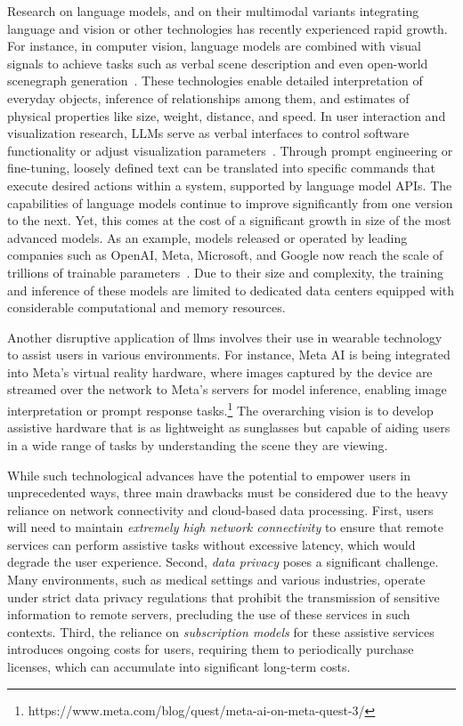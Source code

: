Research on language models, and on their multimodal variants integrating language and vision or other technologies has recently experienced rapid growth.
For instance, in computer vision, language models are combined with visual signals to achieve tasks such as verbal scene description and even open-world scenegraph generation~\cite{Koch2024}. These technologies enable detailed interpretation of everyday objects, inference of relationships among them, and estimates of physical properties like size, weight, distance, and speed.  
In user interaction and visualization research, LLMs serve as verbal interfaces to control software functionality or adjust visualization parameters~\cite{Jia2024_1,Jia2024_2}.
Through prompt engineering or fine-tuning, loosely defined text can be translated into specific commands that execute desired actions within a system, supported by language model APIs.
The capabilities of language models continue to improve significantly from one version to the next. Yet, this comes at the cost of a significant growth in size of the most advanced models. As an example, models released or operated by leading companies such as OpenAI, Meta, Microsoft, and Google now reach the scale of trillions of trainable parameters~\cite{ChatGPT-Hystor_2023}. Due to their size and complexity, the training and inference of these models are limited to dedicated data centers equipped with considerable computational and memory resources. 

Another disruptive application of \glspl{llm} involves their use in wearable technology to assist users in various environments. For instance, Meta AI is being integrated into Meta's virtual reality hardware, where images captured by the device are streamed over the network to Meta's servers for model inference, enabling image interpretation or prompt response tasks.\footnote{https://www.meta.com/blog/quest/meta-ai-on-meta-quest-3/} The overarching vision is to develop assistive hardware that is as lightweight as sunglasses but capable of aiding users in a wide range of tasks by understanding the scene they are viewing.

While such technological advances have the potential to empower users in unprecedented ways, three main drawbacks must be considered due to the heavy reliance on network connectivity and cloud-based data processing. First, users will need to maintain {\em extremely high network connectivity} to ensure that remote services can perform assistive tasks without excessive latency, which would degrade the user experience. Second, {\em data privacy} poses a significant challenge. Many environments, such as medical settings and various industries, operate under strict data privacy regulations that prohibit the transmission of sensitive information to remote servers, precluding the use of these services in such contexts. Third, the reliance on {\em subscription models} for these assistive services introduces ongoing costs for users, requiring them to periodically purchase licenses, which can accumulate into significant long-term costs.

